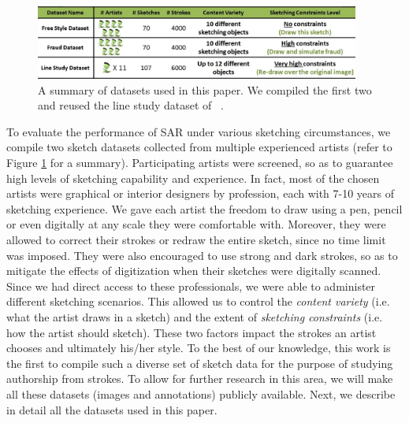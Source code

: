 

\begin{figure}[htbp!]
\centering
\includegraphics[width = 0.95\textwidth]{images/compDatasets.jpg}
\vspace{-1mm}\caption {A summary of datasets used in this paper. We compiled the first two and reused the line study dataset of ~\protect\cite{Cole:2008:PDL:1360612.1360687}.}\vspace{-5mm}
\label{datasetSummary}
\end{figure}

To evaluate the performance of SAR under various sketching circumstances, we compile two sketch datasets collected from multiple experienced artists (refer to Figure \ref{datasetSummary} for a summary). Participating artists were screened, so as to guarantee high levels of sketching capability and experience. In fact, most of the chosen artists were graphical or interior designers by profession, each with 7-10 years of sketching experience. We gave each artist the freedom to draw using a pen, pencil or even digitally at any scale they were comfortable with. Moreover, they were allowed to correct their strokes or redraw the entire sketch, since no time limit was imposed. They were also encouraged to use strong and dark strokes, so as to mitigate the effects of digitization when their sketches were digitally scanned. Since we had direct access to these professionals, we were able to administer different sketching scenarios. This allowed us to control the \emph{content variety} (i.e. what the artist draws in a sketch) and the extent of \emph{sketching constraints} (i.e. how the artist should sketch). These two factors impact the strokes an artist chooses and ultimately his/her style. To the best of our knowledge, this work is the first to compile such a diverse set of sketch data for the purpose of studying authorship from strokes. To allow for further research in this area, we will make all these datasets (images and annotations) publicly available. Next, we describe in detail all the datasets used in this paper.


